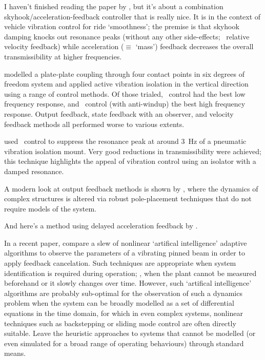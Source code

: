 I haven't finished reading the paper by \textcite{savaresi2007}, but
it's about a combination skyhook/acceleration-feedback controller that
is really nice. It is in the context of vehicle vibration control for
ride `smoothness'; the premise is that skyhook damping knocks out
resonance peaks (without any other side-effects; \cf\ relative
velocity feedback) while acceleration ($\equiv$ `mass') feedback
decreases the overall transmissibility at higher frequencies.



\textcite{kerber2007} modelled a plate-plate coupling through four
contact points in six degrees of freedom system and applied active
vibration isolation in the vertical direction using a range of control
methods. Of those trialed, \Hinf\ control had the best low frequency
response, and \PI\ control (with anti-windup) the best high
frequency response. Output feedback, state feedback with an observer,
and velocity feedback methods all performed worse to various extents.

\textcite{chen2007} used \Hinf\ control to suppress the resonance peak at
around \SI{3}{Hz} of a pneumatic vibration isolation mount. Very good
reductions in transmissibility were achieved; this technique highlights the
appeal of vibration control using an isolator with a damped resonance.

A modern look at output feedback methods is shown by \cite{mottershead2008},
where the dynamics of complex structures is altered via robust pole-placement
techniques that do not require models of the system.

And here's a method using delayed acceleration feedback by
\textcite{chatterjee2008}.


In a recent paper, \textcite{madkour2007} compare a slew of nonlinear
`artifical intelligence' adaptive algorithms to observe the parameters
of a vibrating pinned beam in order to apply feedback cancelation. %
Such techniques are appropriate when system identification is required
during operation; \ie, when the plant cannot be measured beforehand or
it slowly changes over time. However, such `artifical intelligence'
algorithms are probably sub-optimal for the observation of such a
dynamics problem when the system can be broadly modelled as a set of
differential equations in the time domain, for which in even complex systems,
nonlinear techniques such as backstepping or sliding mode control are 
often directly suitable. Leave the heuristic approaches to systems that cannot be
modelled (or even simulated for a broad range of operating behaviours) through standard means.
  
